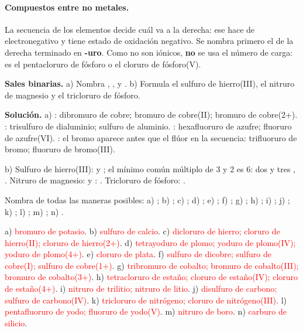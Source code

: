 \paragraph{Compuestos entre no metales.} La secuencia de los elementos decide cuál va a la derecha: ese hace de
electronegativo y tiene estado de oxidación negativo. Se nombra primero el de la derecha terminado en \textbf{-uro}. Como no son
iónicos, \textbf{no} se usa el número de carga:  es el pentacloruro de fósforo o el cloruro de fósforo(V).

\begin{example}
    \textbf{Sales binarias.} a) Nombra , ,  y . b) Formula el sulfuro de hierro(III), el
    nitruro de magnesio y el tricloruro de fósforo.

    \textbf{Solución.} a) : dibromuro de cobre; bromuro de cobre(II); bromuro de cobre(2+). : trisulfuro de
    dialuminio; sulfuro de aluminio. : hexafluoruro de azufre; fluoruro de azufre(VI). : el bromo aparece
    antes que el flúor en la secuencia: trifluoruro de bromo; fluoruro de bromo(III).

    b) Sulfuro de hierro(III):  y ; el mínimo común múltiplo de 3 y 2 es 6: dos  y tres ,
    . Nitruro de magnesio:  y : . Tricloruro de fósforo: .
\end{example}

\begin{exercise}
    Nombra de todas las maneras posibles: a) ; b) ; c) ; d) ; e) ; f) ;
    g) ; h) ; i) ; j) ; k) ; l) ; m) ; n) .
    \begin{solu}
        a) \textcolor{red}{bromuro de potasio}. b) \textcolor{red}{sulfuro de calcio}. c) \textcolor{red}{dicloruro de hierro;
        cloruro de hierro(II); cloruro de hierro(2+)}. d) \textcolor{red}{tetrayoduro de plomo; yoduro de plomo(IV); yoduro de
        plomo(4+)}. e) \textcolor{red}{cloruro de plata}. f) \textcolor{red}{sulfuro de dicobre; sulfuro de cobre(I); sulfuro de
        cobre(1+)}. g) \textcolor{red}{tribromuro de cobalto; bromuro de cobalto(III); bromuro de cobalto(3+)}. h)
        \textcolor{red}{tetracloruro de estaño; cloruro de estaño(IV); cloruro de estaño(4+)}. i) \textcolor{red}{nitruro de
        trilitio; nitruro de litio}. j) \textcolor{red}{disulfuro de carbono; sulfuro de carbono(IV)}. k)
        \textcolor{red}{tricloruro de nitrógeno; cloruro de nitrógeno(III)}. l) \textcolor{red}{pentafluoruro de yodo; fluoruro de
        yodo(V)}. m) \textcolor{red}{nitruro de boro}. n) \textcolor{red}{carburo de silicio}.
    \end{solu}
\end{exercise}

